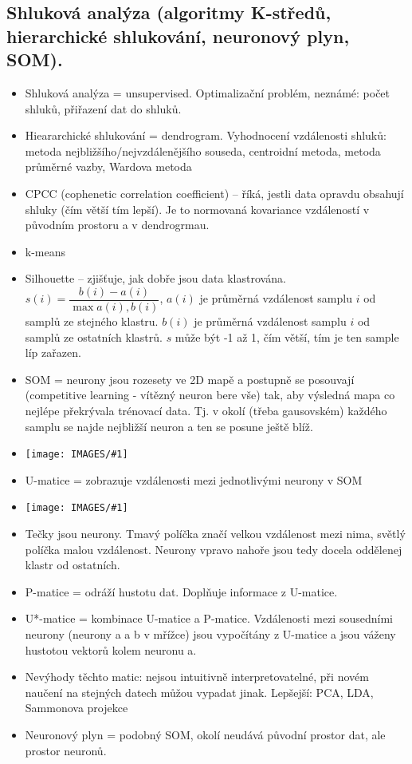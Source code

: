\documentclass[a4paper,hidelinks]{article}
\newcommand{\myimage}[1] {\texttt{[image: IMAGES/\#1]}}
\begin{document}
\subsection{Shluková analýza (algoritmy K-středů, hierarchické shlukování, neuronový plyn, SOM).}

\begin{itemize}
    \item Shluková analýza = unsupervised. Optimalizační problém, neznámé: počet shluků, přiřazení dat do shluků.
    \item Hieararchické shlukování = dendrogram. Vyhodnocení vzdálenosti shluků: metoda nejbližšího/nejvzdálenějšího souseda, centroidní metoda, metoda průměrné vazby, Wardova metoda
    \item CPCC (cophenetic correlation coefficient) -- říká, jestli data opravdu obsahují shluky (čím větší tím lepší). Je to normovaná kovariance vzdáleností v původním prostoru a v dendrogrmau.
    \item k-means
    \item Silhouette -- zjišťuje, jak dobře jsou data klastrována. $s(i) = \dfrac{b(i) - a(i)}{\max{a(i), b(i)}}$, $a(i)$ je průměrná vzdálenost samplu $i$ od samplů ze stejného klastru. $b(i)$ je průměrná vzdálenost samplu $i$ od samplů ze ostatních klastrů. $s$ může být -1 až 1, čím větší, tím je ten sample líp zařazen.
    \item SOM = neurony jsou rozesety ve 2D mapě a postupně se posouvají (competitive learning - vítězný neuron bere vše) tak, aby výsledná mapa co nejlépe překrývala trénovací data. Tj. v okolí (třeba gausovském) každého samplu se najde nejbližší neuron a ten se posune ještě blíž.
    \item \myimage{SOM}
    \item U-matice = zobrazuje vzdálenosti mezi jednotlivými neurony v SOM
    \item \myimage{umatrix}
    \item Tečky jsou neurony. Tmavý políčka značí velkou vzdálenost mezi nima, světlý políčka malou vzdálenost. Neurony vpravo nahoře jsou tedy docela oddělenej klastr od ostatních.
    \item P-matice = odráží hustotu dat. Doplňuje informace z U-matice.
    \item U*-matice = kombinace U-matice a P-matice. Vzdálenosti mezi sousedními neurony (neurony a a b v mřížce) jsou vypočítány z U-matice a jsou váženy hustotou vektorů kolem neuronu a.
    \item Nevýhody těchto matic: nejsou intuitivně interpretovatelné, při novém naučení na stejných datech můžou vypadat jinak. Lepšejší: PCA, LDA, Sammonova projekce 
    \item Neuronový plyn = podobný SOM, okolí neudává původní prostor dat, ale prostor neuronů. 
\end{itemize}
\end{document}
